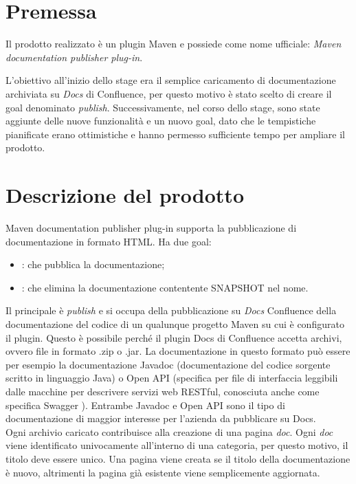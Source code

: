 \section{Premessa}
Il prodotto realizzato è un plugin Maven e possiede come nome ufficiale: \emph{Maven documentation publisher plug-in}.

L'obiettivo all'inizio dello stage era il semplice caricamento di documentazione archiviata su \emph{Docs} di Confluence, per questo motivo è stato scelto di creare il goal denominato \emph{publish}.
Successivamente, nel corso dello stage, sono state aggiunte delle nuove funzionalità e un nuovo goal, dato che le tempistiche pianificate erano ottimistiche e hanno permesso sufficiente tempo per ampliare il prodotto.


\section{Descrizione del prodotto} \label{descrizioneProdotto}

Maven documentation publisher plug-in supporta la pubblicazione di documentazione in formato HTML. Ha due goal:
\begin{itemize}
	\item {}: che pubblica la documentazione;
	\item {}: che elimina la documentazione contentente SNAPSHOT nel nome.
\end{itemize}
Il principale è \emph{publish} e si occupa della pubblicazione su  \emph{Docs} Confluence della documentazione del codice di un qualunque progetto Maven su cui è configurato il plugin.
Questo è possibile perché il plugin Docs di Confluence accetta archivi, ovvero file in formato .zip o .jar.
La documentazione in questo formato può essere per esempio la documentazione Javadoc (documentazione del codice sorgente scritto in linguaggio Java) o Open API (specifica per file di interfaccia leggibili dalle macchine per descrivere servizi web RESTful, conosciuta anche come specifica Swagger \cite{site:specifica-openapi}).
Entrambe Javadoc e Open API sono il tipo di documentazione di maggior interesse per l'azienda da pubblicare su Docs. \\
Ogni archivio caricato contribuisce alla creazione di una pagina \emph{doc}.
Ogni \emph{doc} viene identificato univocamente all'interno di una categoria, per questo motivo, il titolo deve essere unico.
Una pagina viene creata se il titolo della documentazione è nuovo, altrimenti la pagina già esistente viene semplicemente aggiornata. \\ 
 
